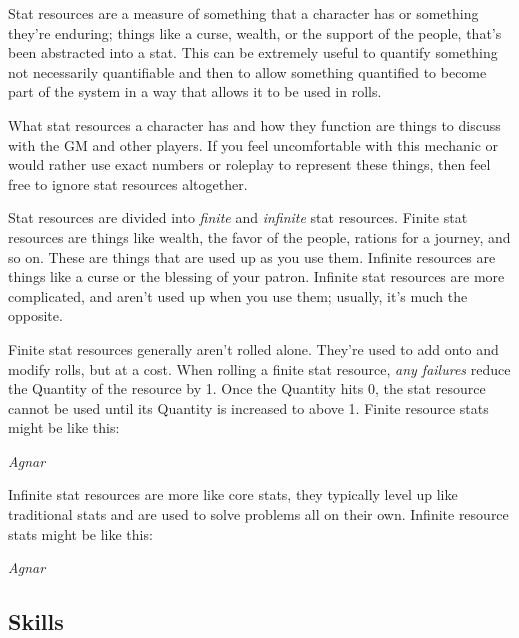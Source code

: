 \documentclass[../main.tex]{subfiles}
\begin{document}
        Stat resources are a measure of something that a character has or something they're enduring; things like a curse, wealth, or the support of the people, that's been abstracted into a stat. This can be extremely useful to quantify something not necessarily quantifiable and then to allow something quantified to become part of the system in a way that allows it to be used in rolls.
        
        What stat resources a character has and how they function are things to discuss with the GM and other players. If you feel uncomfortable with this mechanic or would rather use exact numbers or roleplay to represent these things, then feel free to ignore stat resources altogether.

        Stat resources are divided into \emph{finite} and \emph{infinite} stat resources. Finite stat resources are things like wealth, the favor of the people, rations for a journey, and so on. These are things that are used up as you use them. Infinite resources are things like a curse or the blessing of your patron. Infinite stat resources are more complicated, and aren't used up when you use them; usually, it's much the opposite.

        Finite stat resources generally aren't rolled alone. They're used to add onto and modify rolls, but at a cost. When rolling a finite stat resource, \emph{any failures} reduce the Quantity of the resource by 1. Once the Quantity hits 0, the stat resource cannot be used until its Quantity is increased to above 1. Finite resource stats might be like this:

            \begin{displayquote}
                \emph{Agnar }
            \end{displayquote}

        Infinite stat resources are more like core stats, they typically level up like traditional stats and are used to solve problems all on their own. Infinite resource stats might be like this: 

            \begin{displayquote}
                \emph{Agnar }
            \end{displayquote}

    \subsection{Skills}
\end{document}
